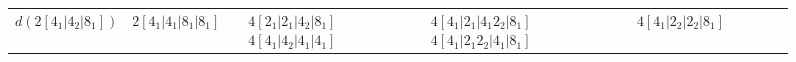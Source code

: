 \begin{figure}
\begin{sideways}
{\begin{tabular}{|c||m{2.5cm}|m{2.5cm}|m{2.5cm}|m{2.5cm}|m{2.5cm}|m{2.5cm}|m{2.5cm}|m{2.5cm}|m{2.5cm}|}
        & %
        & %
        & %
        & %
        \\\hline    
        $d(2[ 4_1  | 4_2  | 8_1  ])$
        & %
        $ 2 [ {4 }_1  | {4 }_1  | {8 }_1  | {8 }_1  ] $ 
        & %
        & %
        $ 4 [ {2 }_1  | {2 }_1  |  {4 }_2 | {8 }_1  ] $ 
        $ 4 [ {4 }_1  |  {4 }_2 | {4 }_1  | {4 }_1  ] $ 
        & %
        $ 4 [ {4 }_1  | {2 }_1  | {4 }_1 {2 }_2 | {8 }_1  ] $ 
        $ 4 [ {4 }_1  | {2 }_1 {2 }_2 | {4 }_1  | {8 }_1  ] $ 
        & %
        $ 4 [ {4 }_1  |  {2 }_2 |  {2 }_2 | {8 }_1  ] $ 
        & %
        & %
        & %
        & %
        \\\hline    
      \end{tabular}
    }
  \end{sideways}
\end{figure}
